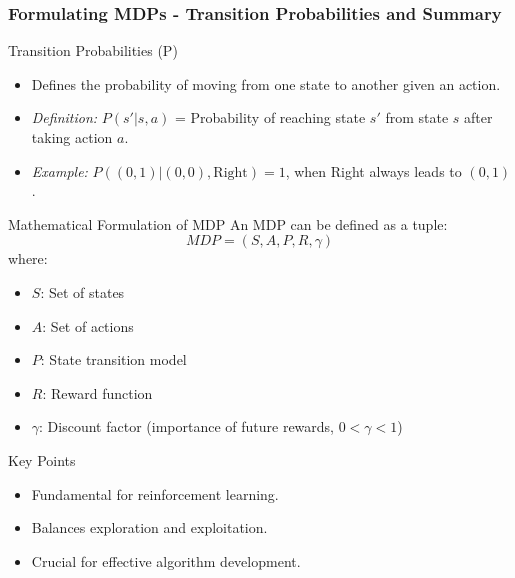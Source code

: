 \documentclass[aspectratio=169]{beamer}
\begin{document}
\begin{frame}[fragile]
    \frametitle{Formulating MDPs - Transition Probabilities and Summary}
    \begin{block}{Transition Probabilities (P)}
        \begin{itemize}
            \item Defines the probability of moving from one state to another given an action.
            \item \textit{Definition:} $P(s' | s, a)$ = Probability of reaching state $s'$ from state $s$ after taking action $a$.
            \item \textit{Example:} $P((0,1) | (0,0), \text{Right}) = 1$, when Right always leads to $(0,1)$.
        \end{itemize}
    \end{block}
    
    \begin{block}{Mathematical Formulation of MDP}
        An MDP can be defined as a tuple: 
        \[
        MDP = (S, A, P, R, \gamma)
        \]
        where:
        \begin{itemize}
            \item $S$: Set of states
            \item $A$: Set of actions
            \item $P$: State transition model
            \item $R$: Reward function
            \item $\gamma$: Discount factor (importance of future rewards, $0 < \gamma < 1$)
        \end{itemize}
    \end{block}
    
    \begin{block}{Key Points}
        \begin{itemize}
            \item Fundamental for reinforcement learning.
            \item Balances exploration and exploitation.
            \item Crucial for effective algorithm development.
        \end{itemize}
    \end{block}
\end{frame}
\end{document}
